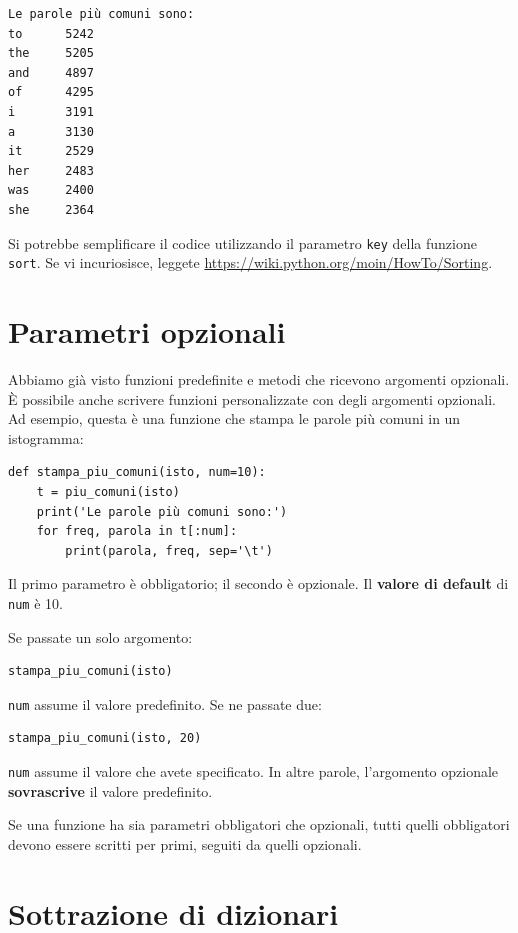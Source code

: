 \documentclass[10pt]{book}
\begin{document}
\begin{verbatim}
Le parole più comuni sono:
to      5242
the     5205
and     4897
of      4295
i       3191
a       3130
it      2529
her     2483
was     2400
she     2364
\end{verbatim}
%
Si potrebbe semplificare il codice utilizzando il parametro {\tt key} della funzione {\tt sort}.  Se vi incuriosisce, leggete
\url{https://wiki.python.org/moin/HowTo/Sorting}.

\section{Parametri opzionali}

Abbiamo già visto funzioni predefinite e metodi che ricevono argomenti opzionali. È possibile anche scrivere funzioni personalizzate con degli argomenti opzionali. Ad esempio, questa è una funzione che stampa le parole più comuni in un istogramma:

\begin{verbatim}
def stampa_piu_comuni(isto, num=10):
    t = piu_comuni(isto)
    print('Le parole più comuni sono:')
    for freq, parola in t[:num]:
        print(parola, freq, sep='\t')
\end{verbatim}

Il primo parametro è obbligatorio; il secondo è opzionale. Il {\bf valore di default} di {\tt num} è 10.

Se passate un solo argomento:

\begin{verbatim}
stampa_piu_comuni(isto)
\end{verbatim}

{\tt num} assume il valore predefinito. Se ne passate due:

\begin{verbatim}
stampa_piu_comuni(isto, 20)
\end{verbatim}

{\tt num} assume il valore che avete specificato. In altre parole, l'argomento opzionale {\bf sovrascrive} il valore predefinito.

Se una funzione ha sia parametri obbligatori che opzionali, tutti quelli obbligatori devono essere scritti per primi, seguiti da quelli opzionali.


\section{Sottrazione di dizionari}
\label{dictsub}
\end{document}
